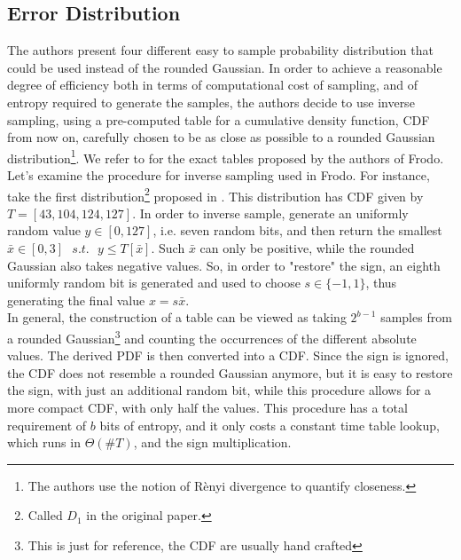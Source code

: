 \subsection{Error Distribution}
The authors present four different easy to sample probability distribution that could be used instead of the rounded Gaussian. In order to achieve a reasonable degree of efficiency both in terms of computational cost of sampling, and of entropy required to generate the samples, the authors decide to use inverse sampling, using a pre-computed table for a cumulative density function, CDF from now on, carefully chosen to be as close as possible to a rounded Gaussian distribution\footnote{The authors use the notion of R\`enyi divergence to quantify closeness.}. We refer to \cite{frodo} for the exact tables proposed by the authors of Frodo.\\
Let's examine the procedure for inverse sampling used in Frodo. For instance, take the first distribution\footnote{Called $D_1$ in the original paper.} proposed in \cite{frodo}. This distribution has CDF given by $T=[43,104,124,127]$. In order to inverse sample, generate an uniformly random value $y\in[0,127]$, i.e. seven random bits, and then return the smallest $\bar{x} \in [0,3]\text{ }s.t.\text{ }y\le T[\bar{x}]$. Such $\bar{x}$ can only be positive, while the rounded Gaussian also takes negative values. So, in order to "restore" the sign, an eighth uniformly random bit is generated and used to choose $s\in\{-1,1\}$, thus generating the final value $x=s\bar{x}$.\\
In general, the construction of a table can be viewed as taking $2^{b-1}$ samples from a rounded Gaussian\footnote{This is just for reference, the CDF are usually hand crafted} and counting the occurrences of the different absolute values. The derived PDF is then converted into a CDF. Since the sign is ignored, the CDF does not resemble a rounded Gaussian anymore, but it is easy to restore the sign, with just an additional random bit, while this procedure allows for a more compact CDF, with only half the values. This procedure has a total requirement of $b$ bits of entropy, and it only costs a constant time table lookup, which runs in $\Theta(\#T)$, and the sign multiplication.\\ 

